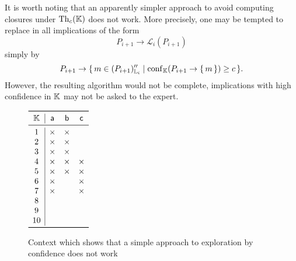 \begin{Example}
  \label{expl:simple-exploration-by-confidence-does-not-work}
  It is worth noting that an apparently simpler approach to avoid computing closures under
  $\operatorname{Th}_{c}({\mathbb{K}})$ does not work.  More precisely, one may be tempted to replace in
   all implications of the form
  \begin{equation*}
    P_{i+1} \to \mathcal{L}_{i}(P_{i+1})
  \end{equation*}
  simply by
  \begin{equation*}
    P_{i+1} \to {\ensuremath{\{\, m \in (P_{i+1})_{{\mathbb{L}}_{i}}'' \mid \operatorname{conf}_{{\mathbb{K}}}(P_{i+1} \to
      {\ensuremath{\{\, m \,\}}}) \ge c \,\}}}.
  \end{equation*}
  However, the resulting algorithm would not be complete, \ie implications with high
  confidence in ${\mathbb{K}}$ may not be asked to the expert.

  \begin{figure}[t]
    \centering
    \def\x{\times}
    \begin{math}
      \begin{array}{c|ccc}
        \toprule
        \con K & \mathsf{a} & \mathsf{b} & \mathsf{c} \\
        \midrule
        1 & \x & \x &    \\
        2 & \x & \x &    \\
        3 & \x & \x &    \\
        4 & \x & \x & \x \\
        5 & \x & \x & \x \\
        6 & \x &    & \x \\
        7 & \x &    & \x \\
        8 &    &    &    \\
        9 &    &    &    \\
        10 &   &    &    \\
        \bottomrule
      \end{array}
    \end{math}
    \caption{\label{fig:simple-exploration-by-confidence-does-not-work} Context which
      shows that a simple approach to exploration by confidence does not work}
  \end{figure}
  

\end{Example}
